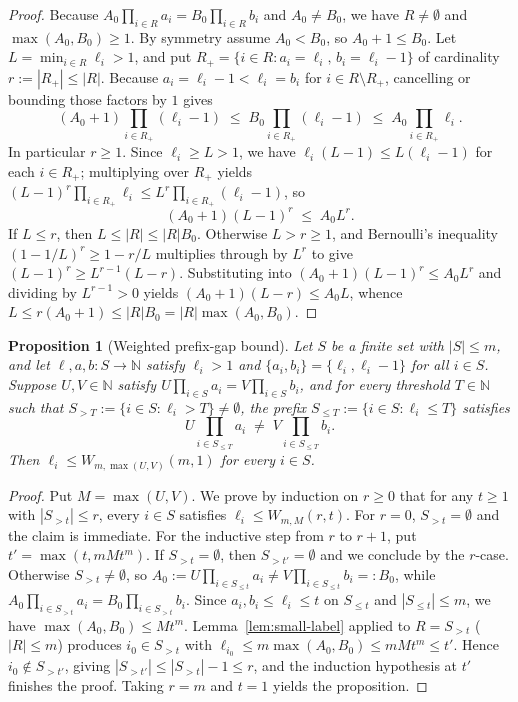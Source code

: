 \documentclass[11pt]{amsart}
\newtheorem{proposition}[theorem]{Proposition}
\theoremstyle{definition}
\theoremstyle{remark}
\begin{document}
\begin{proof}
Because $A_0 \prod_{i \in R} a_i = B_0 \prod_{i \in R} b_i$ and $A_0 \ne B_0$, we have $R \ne \emptyset$ and $\max(A_0, B_0) \ge 1$. By symmetry assume $A_0 < B_0$, so $A_0 + 1 \le B_0$. Let $L = \min_{i \in R} \ell_i > 1$, and put $R_+ = \{i \in R : a_i = \ell_i,\, b_i = \ell_i - 1\}$ of cardinality $r := |R_+| \le |R|$. Because $a_i = \ell_i - 1 < \ell_i = b_i$ for $i \in R \setminus R_+$, cancelling or bounding those factors by $1$ gives
\[
  (A_0 + 1) \prod_{i \in R_+} (\ell_i - 1) \;\le\; B_0 \prod_{i \in R_+} (\ell_i - 1) \;\le\; A_0 \prod_{i \in R_+} \ell_i.
\]
In particular $r \ge 1$. Since $\ell_i \ge L > 1$, we have $\ell_i(L - 1) \le L(\ell_i - 1)$ for each $i \in R_+$; multiplying over $R_+$ yields $(L - 1)^r \prod_{i \in R_+} \ell_i \le L^r \prod_{i \in R_+} (\ell_i - 1)$, so
\[
  (A_0 + 1)(L - 1)^r \;\le\; A_0 L^r.
\]
If $L \le r$, then $L \le |R| \le |R| B_0$. Otherwise $L > r \ge 1$, and Bernoulli's inequality $(1 - 1/L)^r \ge 1 - r/L$ multiplies through by $L^r$ to give $(L - 1)^r \ge L^{r - 1}(L - r)$. Substituting into $(A_0 + 1)(L - 1)^r \le A_0 L^r$ and dividing by $L^{r - 1} > 0$ yields $(A_0 + 1)(L - r) \le A_0 L$, whence $L \le r(A_0 + 1) \le |R| B_0 = |R| \max(A_0, B_0)$.
\end{proof}

\begin{proposition}[Weighted prefix-gap bound]\label{prop:weighted-gap}
Let $S$ be a finite set with $|S| \le m$, and let $\ell, a, b : S \to \mathbb{N}$ satisfy $\ell_i > 1$ and $\{a_i, b_i\} = \{\ell_i, \ell_i - 1\}$ for all $i \in S$. Suppose $U, V \in \mathbb{N}$ satisfy $U \prod_{i \in S} a_i = V \prod_{i \in S} b_i$, and for every threshold $T \in \mathbb{N}$ such that $S_{>T} := \{i \in S : \ell_i > T\} \ne \emptyset$, the prefix $S_{\le T} := \{i \in S : \ell_i \le T\}$ satisfies
\[
  U \prod_{i \in S_{\le T}} a_i \;\ne\; V \prod_{i \in S_{\le T}} b_i.
\]
Then $\ell_i \le W_{m, \max(U, V)}(m, 1)$ for every $i \in S$.
\end{proposition}

\begin{proof}
Put $M = \max(U, V)$. We prove by induction on $r \ge 0$ that for any $t \ge 1$ with $|S_{>t}| \le r$, every $i \in S$ satisfies $\ell_i \le W_{m, M}(r, t)$. For $r = 0$, $S_{>t} = \emptyset$ and the claim is immediate. For the inductive step from $r$ to $r + 1$, put $t' = \max(t, m M t^m)$. If $S_{>t} = \emptyset$, then $S_{>t'} = \emptyset$ and we conclude by the $r$-case. Otherwise $S_{>t} \ne \emptyset$, so $A_0 := U \prod_{i \in S_{\le t}} a_i \ne V \prod_{i \in S_{\le t}} b_i =: B_0$, while $A_0 \prod_{i \in S_{>t}} a_i = B_0 \prod_{i \in S_{>t}} b_i$. Since $a_i, b_i \le \ell_i \le t$ on $S_{\le t}$ and $|S_{\le t}| \le m$, we have $\max(A_0, B_0) \le M t^m$. Lemma~\ref{lem:small-label} applied to $R = S_{>t}$ ($|R| \le m$) produces $i_0 \in S_{>t}$ with $\ell_{i_0} \le m \max(A_0, B_0) \le m M t^m \le t'$. Hence $i_0 \notin S_{>t'}$, giving $|S_{>t'}| \le |S_{>t}| - 1 \le r$, and the induction hypothesis at $t'$ finishes the proof. Taking $r = m$ and $t = 1$ yields the proposition.
\end{proof}
\end{document}
